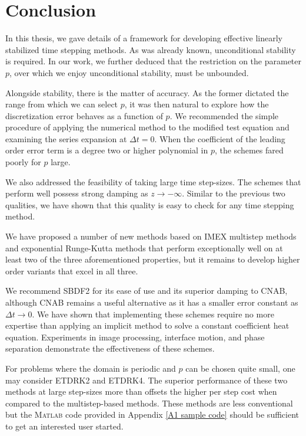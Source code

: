 \chapter{Conclusion}
In this thesis, we gave details of a framework for developing effective linearly stabilized time stepping methods. As was already known, unconditional stability is required. In our work, we further deduced that the restriction on the parameter $p$, over which we enjoy unconditional stability, must be unbounded. 

Alongside stability, there is the matter of accuracy. As the former dictated the range from which we can select $p$, it was then natural to explore how the discretization error behaves as a function of $p$. We recommended the simple procedure of applying the numerical method to the modified test equation and examining the series expansion at $\Delta t = 0$. When the coefficient of the leading order error term is a degree two or higher polynomial in $p$, the schemes fared poorly for $p$ large.

We also addressed the feasibility of taking large time step-sizes. The schemes that perform well possess strong damping as $z\to-\infty$. Similar to the previous two qualities, we have shown that this quality is easy to check for any time stepping method.

We have proposed a number of new methods based on IMEX multistep methods and exponential Runge-Kutta methods that perform exceptionally well on at least two of the three aforementioned properties, but it remains to develop higher order variants that excel in all three.

We recommend SBDF2 for its ease of use and its superior damping to CNAB, although CNAB remains a useful alternative as it has a smaller error constant as $\Delta t \to 0$. We have shown that implementing these schemes require no more expertise than applying an implicit method to solve a constant coefficient heat equation. Experiments in image processing, interface motion, and phase separation demonstrate the effectiveness of these schemes.

For problems where the domain is periodic and $p$ can be chosen quite small, one may consider ETDRK2 and ETDRK4. The superior performance of these two methods at large step-sizes more than offsets the higher per step cost when compared to the multistep-based methods. These methods are less conventional but the \textsc{Matlab} code provided in Appendix \ref{A1 sample code} should be sufficient to get an interested user started.

